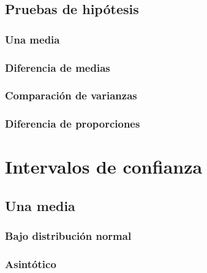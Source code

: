 \documentclass[
]{book}
\begin{document}
\hypertarget{prueba}{%
\section{Pruebas de hipótesis}\label{prueba}}

\hypertarget{una-media}{%
\subsection{Una media}\label{una-media}}

\hypertarget{diferencia-de-medias}{%
\subsection{Diferencia de medias}\label{diferencia-de-medias}}

\hypertarget{comparaciuxf3n-de-varianzas}{%
\subsection{Comparación de varianzas}\label{comparaciuxf3n-de-varianzas}}

\hypertarget{diferencia-de-proporciones}{%
\subsection{Diferencia de proporciones}\label{diferencia-de-proporciones}}

\hypertarget{intervalos-de-confianza}{%
\chapter{Intervalos de confianza}\label{intervalos-de-confianza}}

\hypertarget{una-media-1}{%
\section{Una media}\label{una-media-1}}

\hypertarget{bajo-distribuciuxf3n-normal}{%
\subsection{Bajo distribución normal}\label{bajo-distribuciuxf3n-normal}}

\hypertarget{asintuxf3tico}{%
\subsection{Asintótico}\label{asintuxf3tico}}
\end{document}
